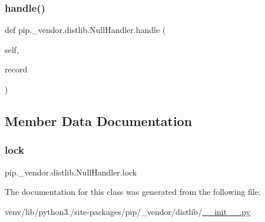 \mbox{\label{classpip_1_1__vendor_1_1distlib_1_1NullHandler_a94b5c4ab0f9180cfb7114c112a4b3974}} 
\subsubsection{\texorpdfstring{handle()}{handle()}}
{\footnotesize\ttfamily def pip.\+\_\+vendor.\+distlib.\+Null\+Handler.\+handle (\begin{DoxyParamCaption}\item[{}]{self,  }\item[{}]{record }\end{DoxyParamCaption})}



\subsection{Member Data Documentation}
\mbox{\label{classpip_1_1__vendor_1_1distlib_1_1NullHandler_aa8d0cbd1c5b8701fe7145d39f79773aa}} 
\subsubsection{\texorpdfstring{lock}{lock}}
{\footnotesize\ttfamily pip.\+\_\+vendor.\+distlib.\+Null\+Handler.\+lock}



The documentation for this class was generated from the following file\+:\begin{DoxyCompactItemize}
\item 
venv/lib/python3./site-\/packages/pip/\+\_\+vendor/distlib/\hyperlink{venv_2lib_2python3_89_2site-packages_2pip_2__vendor_2distlib_2____init_____8py}{\+\_\+\+\_\+init\+\_\+\+\_\+.\+py}\end{DoxyCompactItemize}
